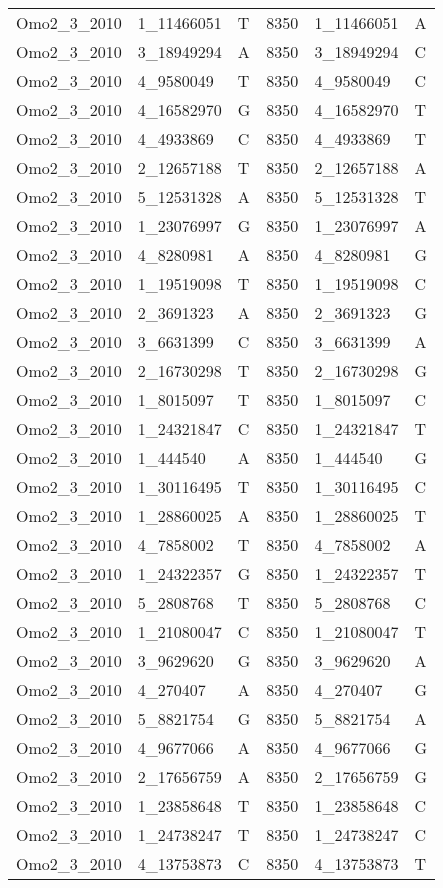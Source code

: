 \begin{center}
\begin{longtable}{|l|l|l|l|l|l|}
Omo2\_3\_2010&1\_11466051&T&8350&1\_11466051&A\\
Omo2\_3\_2010&3\_18949294&A&8350&3\_18949294&C\\
Omo2\_3\_2010&4\_9580049&T&8350&4\_9580049&C\\
Omo2\_3\_2010&4\_16582970&G&8350&4\_16582970&T\\
Omo2\_3\_2010&4\_4933869&C&8350&4\_4933869&T\\
Omo2\_3\_2010&2\_12657188&T&8350&2\_12657188&A\\
Omo2\_3\_2010&5\_12531328&A&8350&5\_12531328&T\\
Omo2\_3\_2010&1\_23076997&G&8350&1\_23076997&A\\
Omo2\_3\_2010&4\_8280981&A&8350&4\_8280981&G\\
Omo2\_3\_2010&1\_19519098&T&8350&1\_19519098&C\\
Omo2\_3\_2010&2\_3691323&A&8350&2\_3691323&G\\
Omo2\_3\_2010&3\_6631399&C&8350&3\_6631399&A\\
Omo2\_3\_2010&2\_16730298&T&8350&2\_16730298&G\\
Omo2\_3\_2010&1\_8015097&T&8350&1\_8015097&C\\
Omo2\_3\_2010&1\_24321847&C&8350&1\_24321847&T\\
Omo2\_3\_2010&1\_444540&A&8350&1\_444540&G\\
Omo2\_3\_2010&1\_30116495&T&8350&1\_30116495&C\\
Omo2\_3\_2010&1\_28860025&A&8350&1\_28860025&T\\
Omo2\_3\_2010&4\_7858002&T&8350&4\_7858002&A\\
Omo2\_3\_2010&1\_24322357&G&8350&1\_24322357&T\\
Omo2\_3\_2010&5\_2808768&T&8350&5\_2808768&C\\
Omo2\_3\_2010&1\_21080047&C&8350&1\_21080047&T\\
Omo2\_3\_2010&3\_9629620&G&8350&3\_9629620&A\\
Omo2\_3\_2010&4\_270407&A&8350&4\_270407&G\\
Omo2\_3\_2010&5\_8821754&G&8350&5\_8821754&A\\
Omo2\_3\_2010&4\_9677066&A&8350&4\_9677066&G\\
Omo2\_3\_2010&2\_17656759&A&8350&2\_17656759&G\\
Omo2\_3\_2010&1\_23858648&T&8350&1\_23858648&C\\
Omo2\_3\_2010&1\_24738247&T&8350&1\_24738247&C\\
Omo2\_3\_2010&4\_13753873&C&8350&4\_13753873&T\\

\end{longtable}
\end{center}
